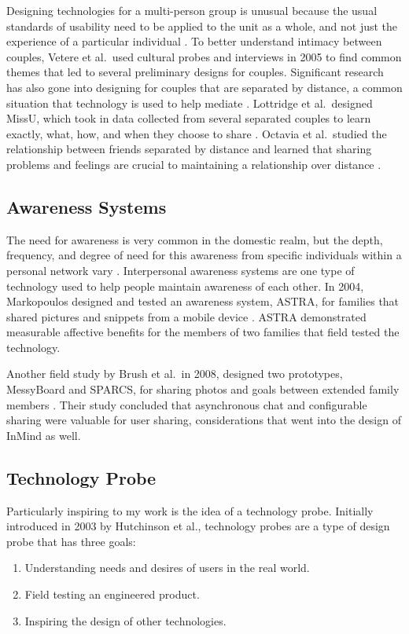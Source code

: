     Designing technologies for a multi-person group is unusual because the usual
    standards of usability need to be applied to the unit as a whole, and not just
    the experience of a particular individual \cite{neustaedter12}.
    To better understand intimacy between couples,
    Vetere et al.\ used cultural probes and interviews in 2005 to find
    common themes that led to several preliminary designs for couples.
    Significant research has also gone into designing for couples that are
    separated by distance,
    a common situation that technology is used to help mediate
    \cite{vetere05}.
    Lottridge et al.\ designed MissU, which took in data collected from several separated couples
    to learn exactly, what, how, and when they choose to share
    \cite{lottridge09}.
    Octavia et al.\ studied the relationship between friends separated by distance
    and learned that sharing problems and feelings are crucial to
    maintaining a relationship over distance
    \cite{octavia07}.

  \subsection{Awareness Systems}
    The need for awareness is very common in the domestic realm,
    but the depth, frequency, and degree of need for this awareness from specific individuals
    within a personal network vary
    \cite{neustaedter06}.
    Interpersonal awareness systems are one type of technology used to
    help people maintain awareness of each other.
    In 2004, Markopoulos designed and tested an
    awareness system, ASTRA, for families that shared pictures and snippets from a mobile
    device
    \cite{markopoulos04}.
    ASTRA demonstrated measurable affective benefits for the members of
    two families that field tested the technology.

    Another field study by Brush et al.\ in 2008,
    designed two prototypes, MessyBoard and SPARCS,
    for sharing photos and goals between extended family members
    \cite{brush08}.
    Their study concluded that asynchronous chat and configurable sharing were
    valuable for user sharing,
    considerations that went into the design of InMind as well.

  \subsection{Technology Probe}
    Particularly inspiring to my work is the idea of a technology probe.
    Initially introduced in 2003 by Hutchinson et al.,
    technology probes are a type of design probe that has three goals:
    \begin{enumerate}
    \item Understanding needs and desires of users in the real world.
    \item Field testing an engineered product.
    \item Inspiring the design of other technologies.
    \end{enumerate}

